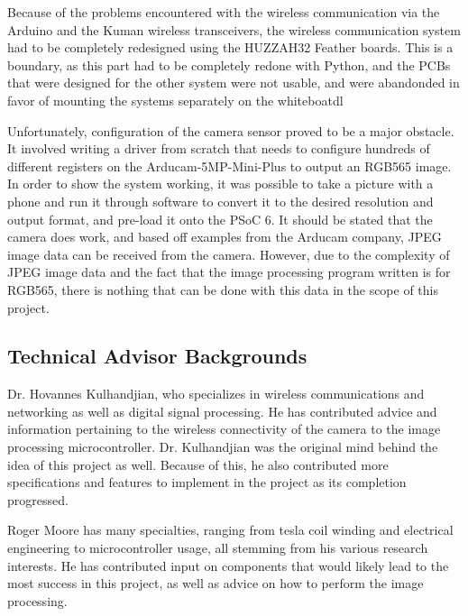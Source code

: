 \setlength{\parindent}{2.5ex} Because of the problems encountered with the wireless communication via the Arduino and the Kuman wireless transceivers, the wireless communication system had to be completely redesigned using the HUZZAH32 Feather boards. This is a boundary, as this part had to be completely redone with Python, and the PCBs that were designed for the other system were not usable, and were abandonded in favor of mounting the systems separately on the whiteboatdl \par
\setlength{\parindent}{2.5ex}
Unfortunately, configuration of the camera sensor proved to be a major obstacle. It involved writing a driver from scratch that needs to configure hundreds of different registers on the Arducam-5MP-Mini-Plus to output an RGB565 image. In order to show the system working, it was possible to take a picture with a phone and run it through software to convert it to the desired resolution and output format, and pre-load it onto the PSoC 6. It should be stated that the camera does work, and based off examples from the Arducam company, JPEG image data can be received from the camera. However, due to the complexity of JPEG image data and the fact that the image processing program written is for RGB565, there is nothing that can be done with this data in the scope of this project.

\subsection{Technical Advisor Backgrounds} \par	
\setlength{\parindent}{2.5ex} Dr. Hovannes Kulhandjian, who specializes in wireless communications and networking as well as digital signal processing. He has contributed advice and information pertaining to the wireless connectivity of the camera to the image processing microcontroller. Dr. Kulhandjian was the original mind behind the idea of this project as well. Because of this, he also contributed more specifications and features to implement in the project as its completion progressed.\par
\setlength{\parindent}{2.5ex}
Roger Moore has many specialties, ranging from tesla coil winding and electrical engineering to microcontroller usage, all stemming from his various research interests. He has contributed input on components that would likely lead to the most success in this project, as well as advice on how to perform the image processing.

